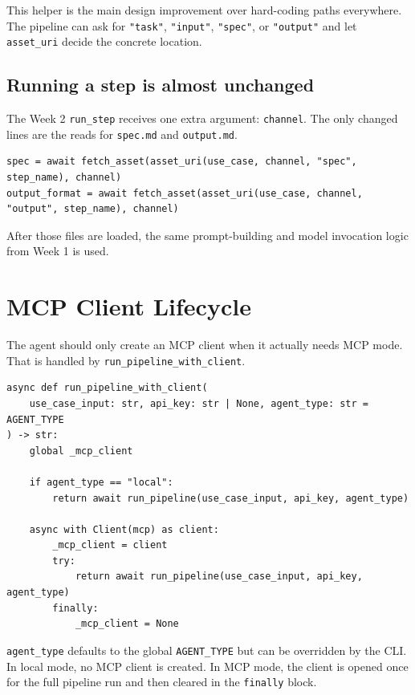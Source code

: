 \documentclass[12pt, a4paper]{article}
\begin{document}
This helper is the main design improvement over hard-coding paths everywhere. The pipeline can ask for \texttt{"task"}, \texttt{"input"}, \texttt{"spec"}, or \texttt{"output"} and let \texttt{asset\_uri} decide the concrete location.

\subsection{Running a step is almost unchanged}

The Week 2 \texttt{run\_step} receives one extra argument: \texttt{channel}. The only changed lines are the reads for \texttt{spec.md} and \texttt{output.md}.

\begin{lstlisting}[style=pythonstyle]
spec = await fetch_asset(asset_uri(use_case, channel, "spec", step_name), channel)
output_format = await fetch_asset(asset_uri(use_case, channel, "output", step_name), channel)
\end{lstlisting}

After those files are loaded, the same prompt-building and model invocation logic from Week 1 is used.

\section{MCP Client Lifecycle}

The agent should only create an MCP client when it actually needs MCP mode. That is handled by \texttt{run\_pipeline\_with\_client}.

\begin{lstlisting}[style=pythonstyle]
async def run_pipeline_with_client(
    use_case_input: str, api_key: str | None, agent_type: str = AGENT_TYPE
) -> str:
    global _mcp_client

    if agent_type == "local":
        return await run_pipeline(use_case_input, api_key, agent_type)

    async with Client(mcp) as client:
        _mcp_client = client
        try:
            return await run_pipeline(use_case_input, api_key, agent_type)
        finally:
            _mcp_client = None
\end{lstlisting}

\texttt{agent\_type} defaults to the global \texttt{AGENT\_TYPE} but can be overridden by the CLI. In local mode, no MCP client is created. In MCP mode, the client is opened once for the full pipeline run and then cleared in the \texttt{finally} block.
\end{document}
